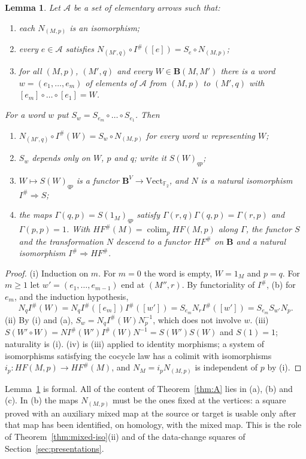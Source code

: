 \documentclass[11pt]{amsart}
\newtheorem{lemma}[theorem]{Lemma}
\theoremstyle{definition}
\theoremstyle{remark}
\theoremstyle{plain}
\numberwithin{equation}{section}
\newcommand{\FF}{\mathbb{F}_2}
\newcommand{\bB}{\mathbf{B}}
\newcommand{\Ish}{I^{\#}}
\newcommand{\HF}{\mathit{HF}}
\begin{document}
\begin{lemma}\label{lem:descent}
Let $\mathcal A$ be a set of elementary arrows such that:
\begin{enumerate}[label=(\alph*)]
\item each $N_{(M,p)}$ is an isomorphism;
\item every $e\in\mathcal A$ satisfies
  $N_{(M',q)}\circ\Ish([e])=S_e\circ N_{(M,p)}$;
\item for all $(M,p)$, $(M',q)$ and every $W\in\bB(M,M')$ there is a
  word $w=(e_1,\dots,e_m)$ of elements of $\mathcal A$ from $(M,p)$ to
  $(M',q)$ with $[e_m]\circ\dots\circ[e_1]=W$.
\end{enumerate}
For a word $w$ put $S_w=S_{e_m}\circ\dots\circ S_{e_1}$. Then
\begin{enumerate}[label=(\roman*)]
\item $N_{(M',q)}\circ\Ish(W)=S_w\circ N_{(M,p)}$ for every word $w$
  representing $W$;
\item $S_w$ depends only on $W$, $p$ and $q$; write it $S(W)_{qp}$;
\item $W\mapsto S(W)_{qp}$ is a functor $\bB^V\to\mathrm{Vect}_{\FF}$,
  and $N$ is a natural isomorphism $\Ish\Rightarrow S$;
\item the maps $\Gamma(q,p)=S(1_M)_{qp}$ satisfy $\Gamma(r,q)\Gamma(q,p)=\Gamma(r,p)$ and
  $\Gamma(p,p)=1$. With $\HF^\#(M)=\operatorname{colim}_p\HF(M,p)$ along
  $\Gamma$, the functor $S$ and the transformation $N$ descend to a functor
  $\HF^\#$ on $\bB$ and a natural isomorphism $\Ish\Rightarrow\HF^\#$.
\end{enumerate}
\end{lemma}

\begin{proof}
(i) Induction on $m$. For $m=0$ the word is empty, $W=1_M$ and $p=q$.
For $m\ge1$ let $w'=(e_1,\dots,e_{m-1})$ end at $(M'',r)$. By
functoriality of $\Ish$, (b) for $e_m$, and the induction hypothesis,
\[
N_q\Ish(W)=N_q\Ish([e_m])\Ish([w'])=S_{e_m}N_r\Ish([w'])
=S_{e_m}S_{w'}N_p.
\]
(ii) By (i) and (a), $S_w=N_q\Ish(W)N_p^{-1}$, which does not involve
$w$. (iii) $S(W'\circ W)=N\Ish(W')\Ish(W)N^{-1}=S(W')S(W)$ and
$S(1)=1$; naturality is (i). (iv) is (iii) applied to identity
morphisms; a system of isomorphisms satisfying the cocycle law has a
colimit with isomorphisms $i_p\colon\HF(M,p)\to\HF^\#(M)$, and
$N_M=i_pN_{(M,p)}$ is independent of $p$ by (i).
\end{proof}

Lemma~\ref{lem:descent} is formal. All of the content of
Theorem~\ref{thm:A} lies in (a), (b) and (c). In (b) the maps
$N_{(M,p)}$ must be the ones fixed at the vertices: a square proved with
an auxiliary mixed map at the source or target is usable only after
that map has been identified, on homology, with the mixed map. This is
the role of Theorem~\ref{thm:mixed-iso}(ii) and of the data-change squares of Section~\ref{sec:presentations}.
\end{document}
